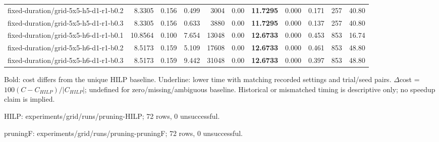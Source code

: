 \documentclass[10pt]{article}
\begin{document}
\begin{tabular}{p{65mm}rrrrrrrrrr}
fixed-\allowbreak duration/\allowbreak grid-\allowbreak 5x5-\allowbreak h5-\allowbreak d1-\allowbreak r1-\allowbreak b0.2 & 8.3305 & 0.156 & 0.499 & 3004 & 0.00 & \textbf{11.7295} & 0.000 & 0.171 & 257 & 40.80 \\
fixed-\allowbreak duration/\allowbreak grid-\allowbreak 5x5-\allowbreak h5-\allowbreak d1-\allowbreak r1-\allowbreak b0.3 & 8.3305 & 0.156 & 0.633 & 3880 & 0.00 & \textbf{11.7295} & 0.000 & 0.137 & 257 & 40.80 \\
fixed-\allowbreak duration/\allowbreak grid-\allowbreak 5x5-\allowbreak h6-\allowbreak d1-\allowbreak r1-\allowbreak b0.1 & 10.8564 & 0.100 & 7.654 & 13048 & 0.00 & \textbf{12.6733} & 0.000 & 0.453 & 853 & 16.74 \\
fixed-\allowbreak duration/\allowbreak grid-\allowbreak 5x5-\allowbreak h6-\allowbreak d1-\allowbreak r1-\allowbreak b0.2 & 8.5173 & 0.159 & 5.109 & 17608 & 0.00 & \textbf{12.6733} & 0.000 & 0.461 & 853 & 48.80 \\
fixed-\allowbreak duration/\allowbreak grid-\allowbreak 5x5-\allowbreak h6-\allowbreak d1-\allowbreak r1-\allowbreak b0.3 & 8.5173 & 0.159 & 9.442 & 31048 & 0.00 & \textbf{12.6733} & 0.000 & 0.397 & 853 & 48.80 \\
\bottomrule\end{tabular}\par
\medskip\footnotesize
Bold: cost differs from the unique HILP baseline. Underline: lower time with matching recorded settings and trial/seed pairs. $\Delta$cost = $100(C-C_{HILP})/|C_{HILP}|$; undefined for zero/missing/ambiguous baseline. Historical or mismatched timing is descriptive only; no speedup claim is implied.\par
HILP: experiments/grid/runs/pruning-HILP; 72 rows, 0 unsuccessful.\par
pruningF: experiments/grid/runs/pruning-pruningF; 72 rows, 0 unsuccessful.\par
\clearpage
\end{document}
